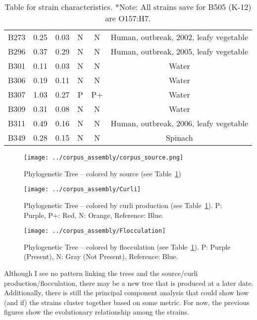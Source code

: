 \documentclass[11pt]{article}
\begin{document}
\begin{table}[h!]
\begin{tabular}{c|c|c|c|c|c}
B273 & 0.25 & 0.03 & N & N &   Human, outbreak, 2002, leafy vegetable        \\
B296 & 0.37 & 0.29 & N & N &   Human, outbreak, 2005, leafy vegetable        \\
B301 & 0.11 & 0.03 & N & N &   Water                                         \\
B306 & 0.19 & 0.11 & N & N &   Water                                         \\
B307 & 1.03 & 0.27 & P & P+ &  Water                                         \\
B309 & 0.31 & 0.08 & N & N &   Water                                         \\
B311 & 0.49 & 0.16 & N & N &   Human, outbreak, 2006, leafy vegetable        \\
B349 & 0.28 & 0.15 & N & N &   Spinach                                       \\
\hline
\end{tabular}
\caption{Table for strain characteristics. *Note: All strains save for B505 (K-12) are O157:H7.}
\label{demographics}
\end{table}


\begin{figure}[ht!]\normalsize %
\centering
\texttt{[image: ../corpus\_assembly/corpus\_source.png]}
\caption{Phylogenetic Tree -- colored by source (see Table~\ref{demographics})}
\label{source_tree}
\end{figure}

\begin{figure}[ht!]\normalsize %
\centering
\texttt{[image: ../corpus\_assembly/Curli]}
\caption{Phylogenetic Tree -- colored by curli production (see Table~\ref{demographics}). P: Purple, P+: Red, N: Orange, Reference: Blue.}
\label{curli_tree}
\end{figure}
\clearpage

\begin{figure}[ht!]\normalsize %
\centering
\texttt{[image: ../corpus\_assembly/Flocculation]}
\caption{Phylogenetic Tree -- colored by flocculation (see Table~\ref{demographics}). P: Purple (Present), N: Gray (Not Present), Reference: Blue.}
\label{flocculation_tree}
\end{figure}

Although I see no pattern linking the trees and the source/curli production/flocculation, there may be a new tree that is produced at a later date. Additionally, there is still the principal component analysis that could show how (and if) the strains cluster together based on some metric. For now, the previous figures show the evolutionary relationship among the strains.\\
\end{document}
